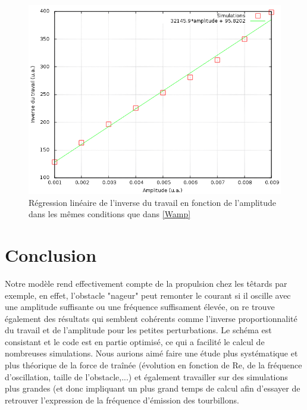 		\begin{figure}[htbp]\begin{center}
			\includegraphics[width=0.7 \textwidth]{9_courbes_extraites.png}
			\caption{Régression linéaire de l'inverse du travail en fonction de l'amplitude dans les mêmes conditions que dans \ref{Wamp}}
			\label{regressinvers}
		\end{center}\end{figure}
		
		
\section*{Conclusion}
	Notre modèle rend effectivement compte de la propulsion chez les têtards par exemple, en effet, l'obstacle "nageur" peut remonter le courant si il oscille avec une amplitude suffisante ou une fréquence suffisament élevée, on re trouve également des résultats qui semblent cohérents comme l'inverse proportionnalité du travail et de l'amplitude pour les petites perturbations.
	Le schéma est consistant et le code est en partie optimisé, ce qui a facilité le calcul de nombreuses simulations.
	Nous aurions aimé faire une étude plus systématique et plus théorique de la force de traînée (évolution en fonction de Re, de la fréquence d'oscillation, taille de l'obstacle,...) et également travailler sur des simulations plus grandes (et donc impliquant un plus grand temps de calcul afin d'essayer de retrouver l'expression de la fréquence d'émission des tourbillons.
	
	
	
	\pagebreak


	
